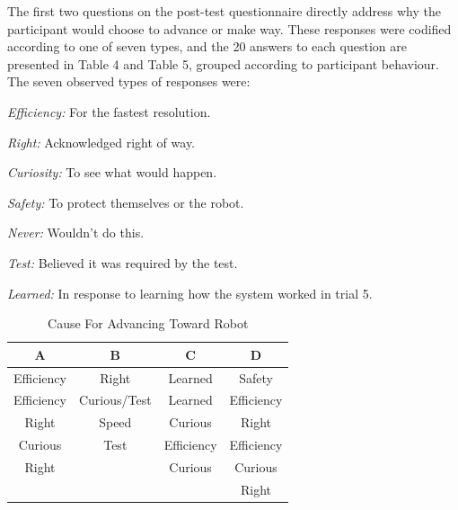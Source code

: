 \documentclass[letterpaper, 10 pt, conference]{ieeeconf}  %
\begin{document}

The first two questions on the post-test questionnaire directly address why the participant would choose to advance or make way. These responses were codified according to one of seven types, and the 20 answers to each question are presented in Table 4 and Table 5, grouped according to participant behaviour. The seven observed types of responses were:

\textit{Efficiency:} For the fastest resolution.

\textit{Right:} Acknowledged right of way.

\textit{Curiosity:} To see what would happen.

\textit{Safety:} To protect themselves or the robot.

\textit{Never:} Wouldn't do this.

\textit{Test:} Believed it was required by the test.

\textit{Learned:} In response to learning how the system worked in trial 5.

\begin{table}[h]
\caption{Cause For Advancing Toward Robot}
\label{Advance}
\begin{center}
\begin{tabular}{|c||c||c||c|}
\hline
\textbf{A} & \textbf{B} & \textbf{C} & \textbf{D}\\
\hline
Efficiency & Right & Learned & Safety\\
\hline
Efficiency & Curious/Test & Learned & Efficiency\\
\hline
Right & Speed & Curious & Right\\
\hline
Curious & Test & Efficiency & Efficiency\\
\hline
Right & & Curious & Curious\\
\hline
 & & & Right\\
\hline
\end{tabular}
\end{center}
\end{table}
\end{document}

